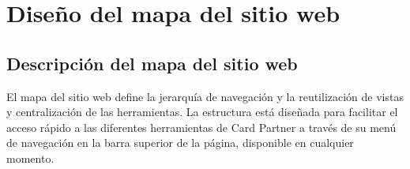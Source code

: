 \documentclass[10pt]{article}
\begin{document}
	
	
	
	\newpage
	\section{Diseño del mapa del sitio web}
	\subsection*{Descripción del mapa del sitio web}
	El mapa del sitio web define la jerarquía de navegación y la reutilización de vistas y centralización de las herramientas. La estructura está diseñada para facilitar el acceso rápido a las diferentes herramientas de Card Partner a través de su menú de navegación en la barra superior de la página, disponible en cualquier momento.\\
	
\end{document}
